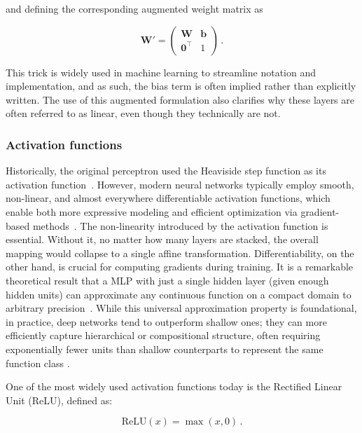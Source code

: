 \noindent and defining the corresponding augmented weight matrix as

\begin{equation}
\label{eq:affine_to_linear_W}
	\mathbf{W'} = 
	\begin{pmatrix} \mathbf{W} & \mathbf{b}\\
	\mathbf{0}^{\intercal} & 1 \end{pmatrix} \,.
\end{equation}

This trick is widely used in machine learning to streamline notation and implementation, and as such, the bias term is often implied rather than explicitly written. The use of this augmented formulation also clarifies why these layers are often referred to as linear, even though they technically are not. 


\subsubsection{Activation functions}

Historically, the original perceptron used the Heaviside step function as its activation function~\cite{mitchell_machine_1997}. However, modern neural networks typically employ smooth, non-linear, and almost everywhere differentiable activation functions, which enable both more expressive modeling and efficient optimization via gradient-based methods~\cite{murphy_probabilistic_2022}. 
The non-linearity introduced by the activation function is essential. Without it, no matter how many layers are stacked, the overall mapping would collapse to a single affine transformation. Differentiability, on the other hand, is crucial for computing gradients during training. 
It is a remarkable theoretical result that a MLP with just a single hidden layer (given enough hidden units) can approximate any continuous function on a compact domain to arbitrary precision~\cite{hornik_multilayer_1989}. While this universal approximation property is foundational, in practice, deep networks tend to outperform shallow ones; they can more efficiently capture hierarchical or compositional structure, often requiring exponentially fewer units than shallow counterparts to represent the same function class \cite{murphy_probabilistic_2022, telgarsky_2016}.


One of the most widely used activation functions today is the Rectified Linear Unit (ReLU), defined as:

\begin{equation}
\label{eq:ReLU}
	\mathrm{ReLU}(x) = \max(x,0) \,.
\end{equation}

